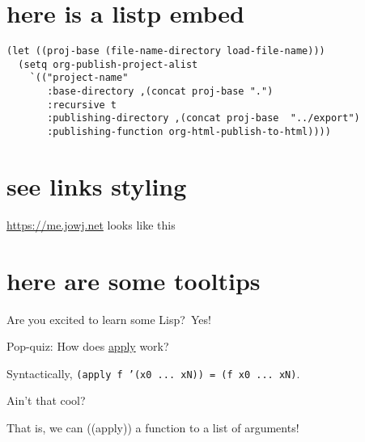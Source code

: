 \documentclass[11pt]{article}
\begin{document}
\section*{here is a listp embed}
\label{sec:org7fc1cb6}

\begin{verbatim}
(let ((proj-base (file-name-directory load-file-name)))
  (setq org-publish-project-alist
	`(("project-name"
	   :base-directory ,(concat proj-base ".")
	   :recursive t
	   :publishing-directory ,(concat proj-base  "../export")
	   :publishing-function org-html-publish-to-html))))
\end{verbatim}
\section*{see links styling}
\label{sec:org5bf6e67}
\url{https://me.jowj.net} looks like this

\section*{here are some tooltips}
\label{sec:org140d24f}
\begin{parallel}
\begingroup\color{orange}Are you excited to learn some Lisp?\endgroup\, \begingroup\color{blue}Yes!\endgroup\,

Pop-quiz: How does \hyperref[org-special-block-extras-glossary-apply]{apply}\label{org-special-block-extras-glossary-declaration-site-apply} work?
\end{parallel}

\begin{details}

Syntactically, \texttt{(apply f '(x0 ... xN)) = (f x0 ... xN)}.

{\color{black} \fbox{\bf [Musa:} Ain't that cool?  \fbox{\bf ]}}

\begin{spoiler}
That is, \begingroup\color{magenta}we can ((apply)) a function to a list of arguments!\endgroup\,
\end{spoiler}
\end{details}
\end{document}
